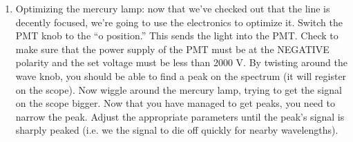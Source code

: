 \documentclass{../lab}
\begin{document}
\begin{enumerate}
    \item Optimizing the mercury lamp: now that we've checked out that the line is decently focused, we're going to use the electronics to optimize it. Switch the PMT knob to the ``o position.'' This sends the light into the PMT. Check to make sure that the power supply of the PMT must be at the NEGATIVE polarity and the set voltage must be less than 2000 V. By twisting around the wave knob, you should be able to find a peak on the spectrum (it will register on the scope). Now wiggle around the mercury lamp, trying to get the signal on the scope bigger. Now that you have managed to get peaks, you need to narrow the peak. Adjust the appropriate parameters until the peak's signal is sharply peaked (i.e. we the signal to die off quickly for nearby wavelengths).
    
    

\end{enumerate}
\end{document}

